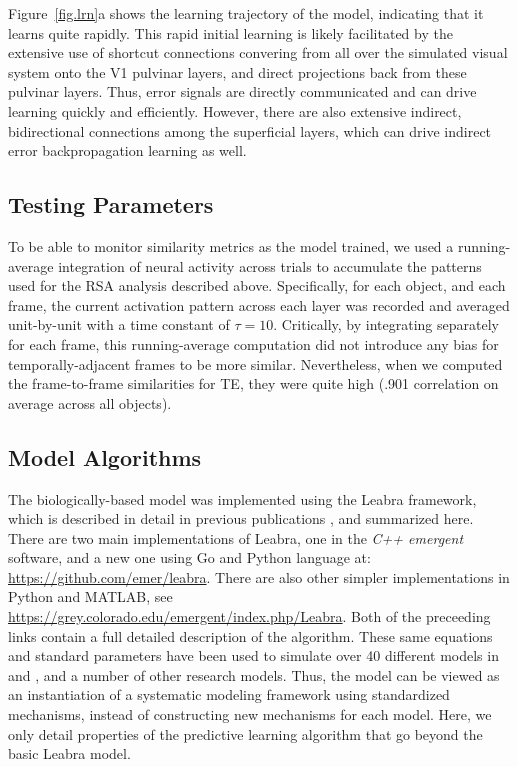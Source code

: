 \documentclass[12pt,twoside]{article}
\newif\myifpdf
\begin{document}
Figure~\ref{fig.lrn}a shows the learning trajectory of the model, indicating that it learns quite rapidly.  This rapid initial learning is likely facilitated by the extensive use of shortcut connections convering from all over the simulated visual system onto the V1 pulvinar layers, and direct projections back from these pulvinar layers.  Thus, error signals are directly communicated and can drive learning quickly and efficiently.  However, there are also extensive indirect, bidirectional connections among the superficial layers, which can drive indirect error backpropagation learning as well.

\subsection{Testing Parameters}

To be able to monitor similarity metrics as the model trained, we used a running-average integration of neural activity across trials to accumulate the patterns used for the RSA analysis described above.  Specifically, for each object, and each frame, the current activation pattern across each layer was recorded and averaged unit-by-unit with a time constant of $\tau = 10$. Critically, by integrating separately for each frame, this running-average computation did not introduce any bias for temporally-adjacent frames to be more similar.  Nevertheless, when we computed the frame-to-frame similarities for TE, they were quite high (.901 correlation on average across all objects).

\subsection{Model Algorithms}

The biologically-based model was implemented using the Leabra framework, which is described in detail in previous publications \cite{OReillyMunakataFrankEtAl12,OReillyMunakata00,OReilly98,OReilly96}, and summarized here.  There are two main implementations of Leabra, one in the {\em C++ emergent} software, and a new one using  Go and Python language at: \url{https://github.com/emer/leabra}.  There are also other simpler implementations in Python and MATLAB, see \url{https://grey.colorado.edu/emergent/index.php/Leabra}.   Both of the preceeding links contain a full detailed description of the algorithm.  These same equations and standard parameters have been used to simulate over 40 different models in  and , and a number of other research models.  Thus, the model can be viewed as an instantiation of a systematic modeling framework using standardized mechanisms, instead of constructing new mechanisms for each model.  Here, we only detail properties of the predictive learning algorithm that go beyond the basic Leabra model.
\end{document}
